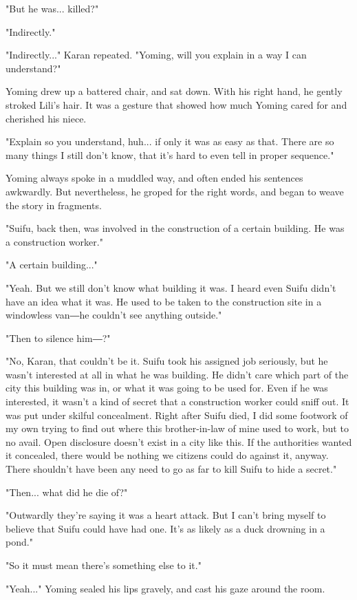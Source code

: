 "But he was... killed?"

"Indirectly."

"Indirectly..." Karan repeated. "Yoming, will you explain in a way I can
understand?"

Yoming drew up a battered chair, and sat down. With his right hand, he
gently stroked Lili's hair. It was a gesture that showed how much Yoming
cared for and cherished his niece.

"Explain so you understand, huh... if only it was as easy as that. There
are so many things I still don't know, that it's hard to even tell in
proper sequence."

Yoming always spoke in a muddled way, and often ended his sentences
awkwardly. But nevertheless, he groped for the right words, and began to
weave the story in fragments.

"Suifu, back then, was involved in the construction of a certain
building. He was a construction worker."

"A certain building..."

"Yeah. But we still don't know what building it was. I heard even Suifu
didn't have an idea what it was. He used to be taken to the construction
site in a windowless van―he couldn't see anything outside."

"Then to silence him―?"

"No, Karan, that couldn't be it. Suifu took his assigned job seriously,
but he wasn't interested at all in what he was building. He didn't care
which part of the city this building was in, or what it was going to be
used for. Even if he was interested, it wasn't a kind of secret that a
construction worker could sniff out. It was put under skilful
concealment. Right after Suifu died, I did some footwork of my own
trying to find out where this brother-in-law of mine used to work, but
to no avail. Open disclosure doesn't exist in a city like this. If the
authorities wanted it concealed, there would be nothing we citizens
could do against it, anyway. There shouldn't have been any need to go as
far to kill Suifu to hide a secret."

"Then... what did he die of?"

"Outwardly they're saying it was a heart attack. But I can't bring
myself to believe that Suifu could have had one. It's as likely as a
duck drowning in a pond."

"So it must mean there's something else to it."

"Yeah..." Yoming sealed his lips gravely, and cast his gaze around the
room.

